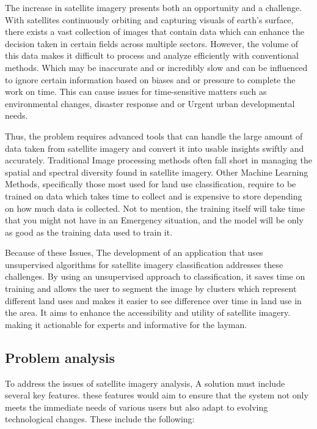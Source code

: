 The increase in satellite imagery presents both an opportunity and a challenge.
With satellites continuously orbiting and capturing visuals of earth's surface, there exists a vast collection of images
that contain data which can enhance the decision taken in certain fields across multiple sectors.
However, the volume of this data makes it difficult to process and analyze efficiently with conventional methods.
Which may be inaccurate and or incredibly slow and can be influenced to ignore certain information based on biases and or pressure
to complete the work on time.
This can cause issues for time-sensitive matters such as environmental changes, disaster response and or Urgent urban developmental needs.

Thus, the problem requires advanced tools that can handle the large amount of data taken from satellite imagery and convert it
into usable insights swiftly and accurately.
Traditional Image processing methods often fall short in managing the spatial and spectral diversity found in satellite imagery.
Other Machine Learning Methods, specifically those most used for land use classification, require to be trained on data which takes time to collect and
is expensive to store depending on how much data is collected.
Not to mention, the training itself will take time that you might not have in an Emergency situation\cite{ahadflooddtec2022}, and the model will be only as good as the training data
used to train it.

Because of these Issues, The development of an application that uses unsupervised algorithms for satellite imagery classification
addresses these challenges.
By using an unsupervised approach to classification, it saves time on training and allows the user to segment the image by clusters which represent
different land uses and makes it easier to see difference over time in land use in the area.
It aims to enhance the accessibility and utility of satellite imagery.
making it actionable for experts and informative for the layman.

\subsection{Problem analysis}\label{subsec:problem-analysis}

To address the issues of satellite imagery analysis, A solution must include several key features.
these features would aim to ensure that the system not only meets the immediate needs of various users but also
adapt to evolving technological changes.
These include the following:

